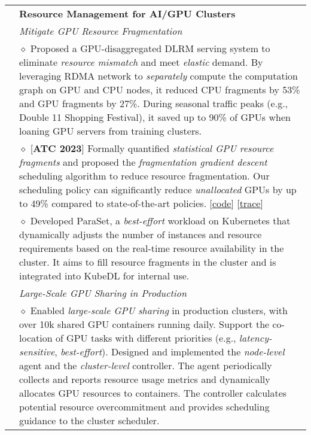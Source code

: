 \documentclass[letterpaper, 10pt]{article}
\begin{document}
\begin{longtable}{p{0.7in}p{6.0in}}
& \textbf{Resource Management for AI/GPU Clusters} \\

& \textit{\emph{Mitigate GPU Resource Fragmentation}} \\
    & $\diamond$
    Proposed a GPU-disaggregated DLRM serving system to eliminate \textit{resource mismatch} and meet \textit{elastic} demand.
    By leveraging RDMA network to \textit{separately} compute the computation graph on GPU and CPU nodes, it reduced CPU fragments by 53\% and GPU fragments by 27\%.
    During seasonal traffic peaks (e.g., Double 11 Shopping Festival), it saved up to 90\% of GPUs when loaning GPU servers from training clusters. \\

    & $\diamond$ [\textbf{ATC 2023}] Formally quantified \textit{statistical GPU resource fragments} and proposed the \textit{fragmentation gradient descent} scheduling algorithm to reduce resource fragmentation. Our scheduling policy can significantly reduce \textit{unallocated} GPUs by up to 49\% compared to state-of-the-art policies. [\href{https://github.com/hkust-adsl/kubernetes-scheduler-simulator}{\underline{code}}] [\href{https://github.com/alibaba/clusterdata/tree/master/cluster-trace-gpu-v2023}{\underline{trace}}] \\

    & $\diamond$ Developed ParaSet, a \textit{best-effort} workload on Kubernetes that dynamically adjusts the number of instances and resource requirements based on the real-time resource availability in the cluster. It aims to fill resource fragments in the cluster and is integrated into KubeDL for internal use. \\

& \textit{\emph{Large-Scale GPU Sharing in Production}} \\
    & $\diamond$ Enabled \textit{large-scale GPU sharing} in production clusters, with over 10k shared GPU containers running daily. Support the co-location of GPU tasks with different priorities (e.g., \textit{latency-sensitive}, \textit{best-effort}). Designed and implemented the \textit{node-level} agent and the \textit{cluster-level} controller. The agent periodically collects and reports resource usage metrics and dynamically allocates GPU resources to containers. The controller calculates potential resource overcommitment and provides scheduling guidance to the cluster scheduler. \\


\end{longtable}
\end{document}
